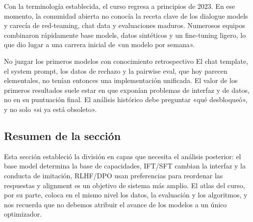 Con la terminología establecida, el curso regresa a principios de 2023. En ese momento, la comunidad abierta no conocía la receta clave de los dialogue models y carecía de red-teaming, chat data y evaluaciones maduros. Numerosos equipos combinaron rápidamente base models, datos sintéticos y un fine-tuning ligero, lo que dio lugar a una carrera inicial de «un modelo por semana».


\begin{warningbox}{No juzgar los primeros modelos con conocimiento retrospectivo}
El chat template, el system prompt, los datos de rechazo y la pairwise eval, que hoy parecen elementales, no tenían entonces una implementación unificada. El valor de los primeros resultados suele estar en que exponían problemas de interfaz y de datos, no en su puntuación final. El análisis histórico debe preguntar «qué desbloqueó», y no solo «si ya está obsoleto».
\end{warningbox}


\subsection{Resumen de la sección}

Esta sección estableció la división en capas que necesita el análisis posterior: el base model determina la base de capacidades, IFT/SFT cambian la interfaz y la conducta de imitación, RLHF/DPO usan preferencias para reordenar las respuestas y alignment es un objetivo de sistema más amplio. El atlas del curso, por su parte, coloca en el mismo nivel los datos, la evaluación y los algoritmos, y nos recuerda que no debemos atribuir el avance de los modelos a un único optimizador.
